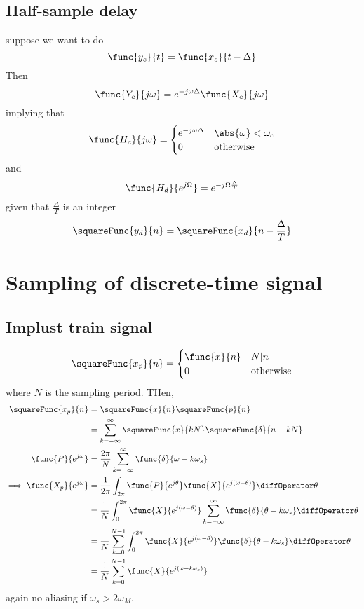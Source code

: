 \subsection*{Half-sample delay}
suppose we want to do 
\begin{equation*}
    \func{y_c}{t} = \func{x_c}{t - \Delta}
\end{equation*}
Then 
\begin{equation*}
    \func{Y_c}{j\omega} = e^{-j \omega \Delta} \func{X_c}{j\omega}
\end{equation*}
implying that 
\begin{equation*}
    \func{H_c}{j\omega} = \begin{cases}
        e^{-j\omega \Delta} & \abs{\omega} < \omega_c \\ 
        0 & \text{otherwise}
    \end{cases}
\end{equation*}
and 
\begin{equation*}
    \func{H_d}{e^{j\Omega}} = e^{-j\Omega \frac{\Delta}{T}}
\end{equation*}
given that \(\frac{\Delta}{T}\) is an integer 
\begin{equation*}
    \squareFunc{y_d}{n} = \squareFunc{x_d}{n - \dfrac{\Delta}{T}}
\end{equation*}

\section{Sampling of discrete-time signal}
\subsection*{Implust train signal}
\begin{equation*}
    \squareFunc{x_p}{n} = \begin{cases}
        \func{x}{n} & N | n \\
        0 & \text{otherwise}
    \end{cases}
\end{equation*}
where \(N\) is the sampling period. THen, 
\begin{align*}
    \squareFunc{x_p}{n} &= \squareFunc{x}{n} \squareFunc{p}{n}\\
    &= \sum_{k = -\infty}^{\infty} \squareFunc{x}{kN} \squareFunc{\delta}{n - kN}\\ 
    \func{P}{e^{j\omega}} &= \dfrac{2\pi}{N} \sum_{k = -\infty}^{\infty} \func{\delta}{\omega - k\omega_s}\\
    \implies \func{X_p}{e^{j\omega}} &= \dfrac{1}{2\pi} \int_{2\pi} \func{P}{e^{j\theta}} \func{X}{e^{j(\omega - \theta)}} \diffOperator \theta \\
    &= \dfrac{1}{N} \int_{0}^{2\pi} \func{X}{e^{j(\omega - \theta)}} \sum_{k = -\infty}^{\infty}\func{\delta}{\theta - k\omega_s} \diffOperator \theta\\
    &= \dfrac{1}{N} \sum_{k = 0}^{N-1} \int_{0}^{2\pi} \func{X}{e^{j(\omega - \theta)}} \func{\delta}{\theta - k\omega_s} \diffOperator \theta\\
    &= \dfrac{1}{N} \sum_{k = 0}^{N-1} \func{X}{e^{j(\omega - k\omega_s)}}
\end{align*}
again no aliasing if \(\omega_s > 2\omega_M\).

